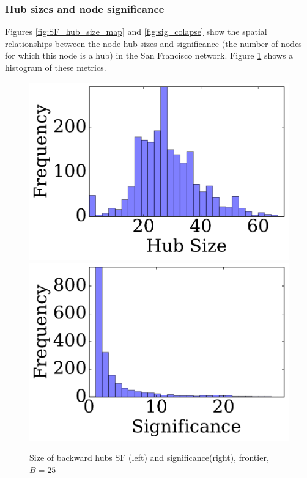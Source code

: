 % 


\subsubsection{Hub sizes and node significance}

Figures \ref{fig:SF_hub_size_map} and \ref{fig:sig_colapse} show the spatial relationships between the node hub sizes and significance (the number of nodes for which this node is a hub) in the San Francisco network. Figure \ref{fig:SF_bwd_size} shows a histogram of these metrics. 

\begin{figure} 
\begin{center}
\includegraphics[clip, trim = 0.1cm 0.3cm 0cm 0cm,scale=0.27]{TexImg/SF_bwd_hub_size.pdf}
\includegraphics[clip, trim = 1.3cm 0.3cm 0cm 0cm,scale=0.27]{TexImg/significance.pdf}
\end{center}
\caption{Size of backward hubs SF (left) and significance(right), frontier, $B=25$}\label{fig:SF_bwd_size}
\end{figure}



